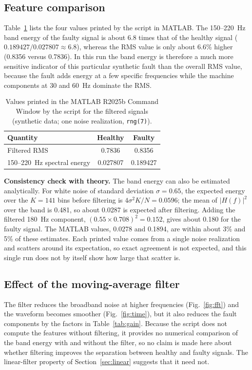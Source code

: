 \documentclass[10pt,twocolumn,a4paper]{article}
\begin{document}
\subsection{Feature comparison}\label{sec:feat}
Table~\ref{tab:res} lists the four values printed by the script in MATLAB. The 150--220~Hz band energy of the faulty signal is about 6.8 times that of the healthy signal
($0.189427/0.027807\approx6.8$), whereas the RMS value is only about 6.6\% higher (0.8356 versus 0.7836). In this run the band energy is therefore a much more
sensitive indicator of this particular synthetic fault than the overall RMS value, because the fault adds energy at a few specific frequencies while the machine components at 30 and 60~Hz dominate the RMS.

\begin{table}[t]
\centering\caption{Values printed in the MATLAB R2025b Command Window by the script for the filtered signals (synthetic data; one noise realization, \texttt{rng(7)}).}\label{tab:res}
\begin{tabular}{lcc}\toprule
Quantity & Healthy & Faulty\\\midrule
Filtered RMS & 0.7836 & 0.8356\\
150--220~Hz spectral energy & 0.027807 & 0.189427\\\bottomrule
\end{tabular}
\end{table}

\textbf{Consistency check with theory.} The band energy can also be estimated analytically. For white noise of standard deviation $\sigma=0.65$, the expected energy over the $K=141$ bins before filtering is
$4\sigma^{2}K/N=0.0596$; the mean of $|H(f)|^{2}$ over the band is 0.481, so about 0.0287 is expected after filtering. Adding the filtered 180~Hz component, $(0.55\times0.708)^{2}=0.152$,
gives about 0.180 for the faulty signal. The MATLAB values, 0.0278 and 0.1894, are within about 3\% and 5\% of these estimates. Each printed value comes from a single noise realization and scatters around its expectation,
so exact agreement is not expected, and this single run does not by itself show how large that scatter is.

\subsection{Effect of the moving-average filter}
The filter reduces the broadband noise at higher frequencies (Fig.~\ref{fig:fft}) and the waveform becomes smoother (Fig.~\ref{fig:time}), but it also reduces
the fault components by the factors in Table~\ref{tab:gain}. Because the script does not compute the features without filtering, it provides no
numerical comparison of the band energy with and without the filter, so no claim is made here about whether filtering improves the separation between healthy and faulty
signals. The linear-filter property of Section~\ref{sec:linear} suggests that it need not.
\end{document}
